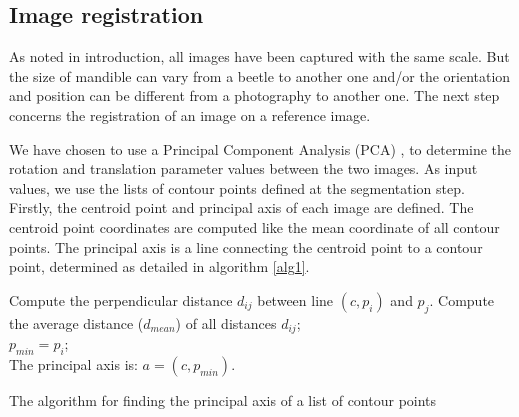 \documentclass[twoside,twocolumn,10pt]{article}
\begin{document}
\subsection{Image registration}

As noted in introduction, all images have been captured with the same scale.
But the size of mandible can vary from a beetle to another one and/or the orientation and position can be different from a photography to another one.
The next step concerns the registration of an image on a reference image.

We have chosen to use a Principal Component Analysis (PCA) \cite{bsspca}, \cite{shlens2014tutorial} to determine the rotation and translation parameter values between the two images.
As input values, we use the lists of contour points defined at the segmentation step.
Firstly, the centroid point and principal axis of each image are defined.
The centroid point coordinates are computed like the mean coordinate of all contour points.
The principal axis is a line connecting the centroid point to a contour point, determined as detailed in algorithm \ref{alg1}.

\begin{algorithm}
	{
		{
			{
				Compute the perpendicular distance $d_{ij}$ between line $(c,p_i)$ and $p_j$.
			}		
		}
		Compute the average distance ($d_{mean}$) of all distances $d_{ij}$;\\

		{
			$p_{min} = p_i$;\\
		}
	}
	The principal axis is: $a = (c,p_{min})$.
	\caption{The algorithm for finding the principal axis of a list of contour points}
	\label{alg1}
\end{algorithm}
\end{document}
